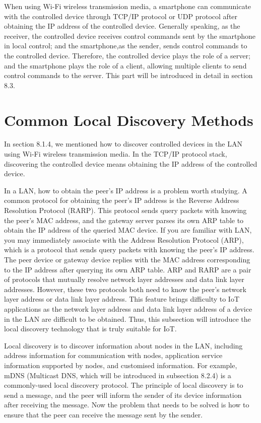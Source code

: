 \documentclass[a4paper,12pt,openany]{book}
\begin{document}
When using Wi-Fi wireless transmission media, a smartphone can communicate with the controlled device through TCP/IP protocol or UDP protocol after obtaining the IP address of the controlled device. Generally speaking, as the receiver, the controlled device receives control commands sent by the smartphone in local control; and the smartphone,as the sender, sends control commands to the controlled device. Therefore, the controlled device plays the role of a server; and the smartphone plays the role of a client, allowing multiple clients to send control commands to the server. This part will be introduced in detail in section 8.3.

\section{Common Local Discovery Methods}
In section 8.1.4, we mentioned how to discover controlled devices in the LAN using Wi-Fi wireless transmission media. In the TCP/IP protocol stack, discovering the controlled device means obtaining the IP address of the controlled device.

In a LAN, how to obtain the peer’s IP address is a problem worth studying. A common protocol for obtaining the peer’s IP address is the Reverse Address Resolution Protocol (RARP). This protocol sends query packets with knowing the peer’s MAC address, and the gateway server parses its own ARP table to obtain the IP address of the queried MAC device. If you are familiar with LAN, you may immediately associate with the Address Resolution Protocol (ARP), which is a protocol that sends query packets with knowing the peer’s IP address. The peer device or gateway device replies with the MAC address corresponding to the IP address after querying its own ARP table. ARP and RARP are a pair of protocols that mutually resolve network layer addresses and data link layer addresses. However, these two protocols both need to know the peer’s network layer address or data link layer address. This feature brings difficulty to IoT applications as the network layer address and data link layer address of a device in the LAN are difficult to be obtained. Thus, this subsection will introduce the local discovery technology that is truly suitable for IoT.

Local discovery is to discover information about nodes in the LAN, including address information for communication with nodes, application service information supported by nodes, and customised information. For example, mDNS (Multicast DNS, which will be introduced in subsection 8.2.4) is a commonly-used local discovery protocol. The principle of local discovery is to send a message, and the peer will inform the sender of its device information after receiving the message. Now the problem that needs to be solved is how to ensure that the peer can receive the message sent by the sender.
\end{document}
